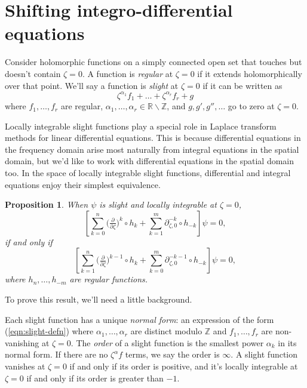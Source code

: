 \documentclass{article}
\theoremstyle{plain}
\newtheorem{prop}{Proposition}
\newcommand{\Z}{\mathbb{Z}}
\newcommand{\R}{\mathbb{R}}
\newcommand{\fracderiv}[3]{\partial^{#1}_{#2, #3}}
\begin{document}
\section{Shifting integro-differential equations}\label{shifting}
Consider holomorphic functions on a simply connected open set that touches but doesn't contain $\zeta = 0$. A function is {\em regular} at $\zeta = 0$ if it extends holomorphically over that point. We'll say a function is {\em slight} at $\zeta = 0$ if it can be written as
\begin{equation}\label{eqn:slight-defn}
\zeta^{\alpha_1} f_1 + \ldots + \zeta^{\alpha_r} f_r + g
\end{equation}
where $f_1, \ldots, f_r$ are regular, $\alpha_1, \ldots, \alpha_r \in \R \smallsetminus \Z$, and $g, g', g'', \ldots$ go to zero at $\zeta = 0$.

Locally integrable slight functions play a special role in Laplace transform methods for linear differential equations. This is because differential equations in the frequency domain arise most naturally from integral equations in the spatial domain, but we'd like to work with differential equations in the spatial domain too. In the space of locally integrable slight functions, differential and integral equations enjoy their simplest equivalence.
\begin{prop}\label{prop:shifting}
When $\psi$ is slight and locally integrable at $\zeta = 0$,
\[ \left[ \sum_{k = 0}^n \big(\tfrac{\partial}{\partial \zeta}\big)^k \circ h_k + \sum_{k = 1}^m \fracderiv{-k}{\zeta}{0} \circ h_{-k} \right] \psi = 0, \]
if and only if
\[ \left[ \sum_{k = 1}^n \big(\tfrac{\partial}{\partial \zeta}\big)^{k-1} \circ h_k + \sum_{k = 0}^m \fracderiv{-k-1}{\zeta}{0} \circ h_{-k} \right] \psi = 0, \]
where $h_n, \ldots, h_{-m}$ are regular functions.
\end{prop}
To prove this result, we'll need a little background.

Each slight function has a unique {\em normal form}: an expression of the form (\ref{eqn:slight-defn}) where $\alpha_1, \ldots, \alpha_r$ are distinct modulo $\Z$ and $f_1, \ldots, f_r$ are non-vanishing at $\zeta = 0$. The {\em order} of a slight function is the smallest power $\alpha_k$ in its normal form. If there are no $\zeta^\alpha f$ terms, we say the order is $\infty$. A slight function vanishes at $\zeta = 0$ if and only if its order is positive, and it's locally integrable at $\zeta = 0$ if and only if its order is greater than $-1$.
\end{document}
